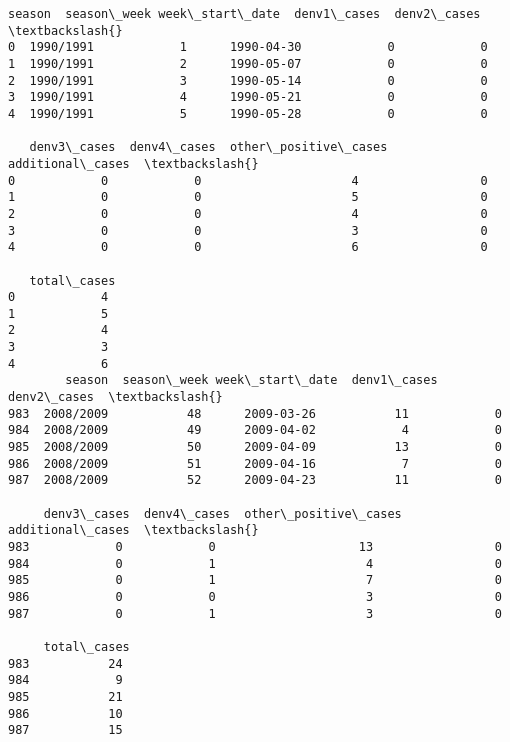 \documentclass[11pt]{article}
\begin{document}
    \begin{Verbatim}[commandchars=\\\{\}]
      season  season\_week week\_start\_date  denv1\_cases  denv2\_cases  \textbackslash{}
0  1990/1991            1      1990-04-30            0            0   
1  1990/1991            2      1990-05-07            0            0   
2  1990/1991            3      1990-05-14            0            0   
3  1990/1991            4      1990-05-21            0            0   
4  1990/1991            5      1990-05-28            0            0   

   denv3\_cases  denv4\_cases  other\_positive\_cases  additional\_cases  \textbackslash{}
0            0            0                     4                 0   
1            0            0                     5                 0   
2            0            0                     4                 0   
3            0            0                     3                 0   
4            0            0                     6                 0   

   total\_cases  
0            4  
1            5  
2            4  
3            3  
4            6  
        season  season\_week week\_start\_date  denv1\_cases  denv2\_cases  \textbackslash{}
983  2008/2009           48      2009-03-26           11            0   
984  2008/2009           49      2009-04-02            4            0   
985  2008/2009           50      2009-04-09           13            0   
986  2008/2009           51      2009-04-16            7            0   
987  2008/2009           52      2009-04-23           11            0   

     denv3\_cases  denv4\_cases  other\_positive\_cases  additional\_cases  \textbackslash{}
983            0            0                    13                 0   
984            0            1                     4                 0   
985            0            1                     7                 0   
986            0            0                     3                 0   
987            0            1                     3                 0   

     total\_cases  
983           24  
984            9  
985           21  
986           10  
987           15  

    \end{Verbatim}
\end{document}
